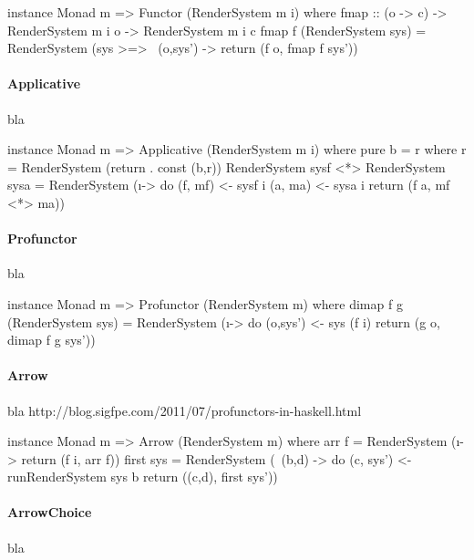 \begin{haskell}[label={lst:rendersystem-functor},caption={Functor Instanz für RenderSystem}]
instance Monad m => Functor (RenderSystem m i) where
  fmap :: (o -> c) -> RenderSystem m i o -> RenderSystem m i c
  fmap f (RenderSystem sys) = RenderSystem (sys >=> \ (o,sys') -> return (f o, fmap f sys'))
\end{haskell}

\paragraph{Applicative}
bla

\begin{haskell}[label={lst:rendersystem-applicative},caption={Applicative Instanz für RenderSystem}]
instance Monad m => Applicative (RenderSystem m i) where
  pure b = r where r = RenderSystem (return . const (b,r))
  RenderSystem sysf <*> RenderSystem sysa = RenderSystem (\i -> do
    (f, mf) <- sysf i
    (a, ma) <- sysa i
    return (f a, mf <*> ma))
\end{haskell}

\paragraph{Profunctor}
bla

\begin{haskell}[label={lst:rendersystem-profunctor},caption={Profunctor Instanz für RenderSystem}]
instance Monad m => Profunctor (RenderSystem m) where
  dimap f g (RenderSystem sys) = RenderSystem (\i -> do
    (o,sys') <- sys (f i)
    return (g o, dimap f g sys'))
\end{haskell}

\paragraph{Arrow}
bla http://blog.sigfpe.com/2011/07/profunctors-in-haskell.html
\cite{Asada2010}

\begin{haskell}[label={lst:rendersystem-arrow},caption={Arrow Instanz für RenderSystem}]
instance Monad m => Arrow (RenderSystem m) where
  arr f = RenderSystem (\i -> return (f i, arr f))
  first sys = RenderSystem (\ (b,d) -> do
    (c, sys') <- runRenderSystem sys b
    return ((c,d), first sys'))
\end{haskell}

\paragraph{ArrowChoice}
bla

